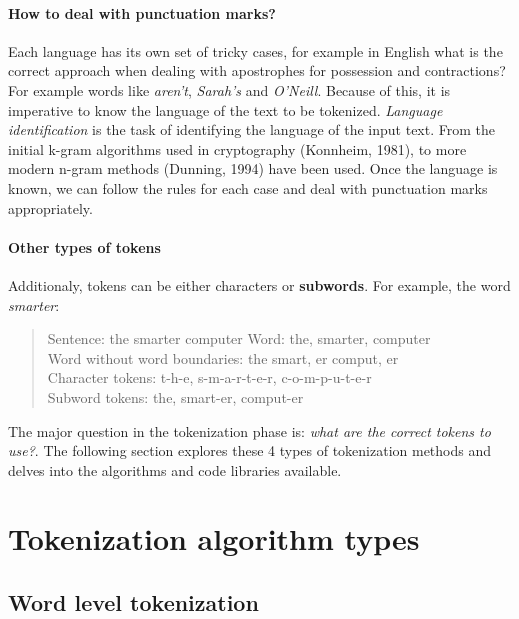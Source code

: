 \paragraph{How to deal with punctuation marks?}

Each language has its own set of tricky cases, for example in English what is the correct approach when dealing with apostrophes for possession and contractions? For example words like \emph{aren't}, \emph{Sarah's} and \emph{O'Neill}. Because of this, it is imperative to know the language of the text to be tokenized. \textit{Language identification} is the task of identifying the language of the input text. From the initial k-gram algorithms used in cryptography (Konnheim, 1981), to more modern n-gram methods (Dunning, 1994) have been used. Once the language is known, we can follow the rules for each case and deal with punctuation marks appropriately.

\paragraph{Other types of tokens}

Additionaly, tokens can be either characters or \textbf{subwords}. For example, the word \emph{smarter}:

\begin{quote}
    Sentence: the smarter computer
    Word: the, smarter, computer\\
    Word without word boundaries: the smart, er comput, er\\
    Character tokens: t-h-e, s-m-a-r-t-e-r, c-o-m-p-u-t-e-r\\
    Subword tokens: the, smart-er, comput-er
\end{quote}

The major question in the tokenization phase is: \textit{what are the correct tokens to use?}. The following section explores these 4 types of tokenization methods and delves into the algorithms and code libraries available.

\section{Tokenization algorithm types}\label{subsec:toktypes}

\subsection{Word level tokenization}

